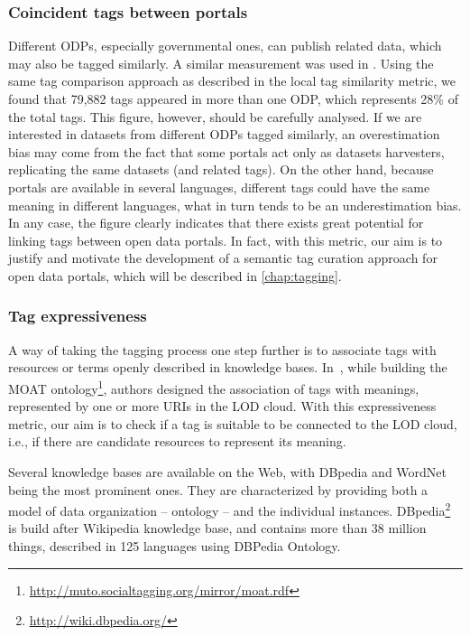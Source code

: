\subsubsection{Coincident tags between portals}
Different ODPs, especially governmental ones, can publish related data, which may also be tagged similarly.
A similar measurement was used in \cite{Umbrich2015}.
Using the same tag comparison approach as described in the local tag similarity metric, we found that 79,882 tags appeared in more than one ODP, which represents 28\% of the total tags. 
This figure, however, should be carefully analysed. 
If we are interested in datasets from different ODPs tagged similarly, an overestimation bias may come from the fact that some portals act only as datasets harvesters, replicating the same datasets (and related tags). 
On the other hand, because portals are available in several languages, different tags could have the same meaning in different languages, what in turn tends to be an underestimation bias.
In any case, the figure clearly indicates that there exists great potential for linking tags between open data portals.
In fact, with this metric, our aim is to justify and motivate the development of a semantic tag curation approach for open data portals, which will be described in \autoref{chap:tagging}. 



\subsubsection{Tag expressiveness}
A way of taking the tagging process one step further is to associate tags with resources or terms openly described in knowledge bases.
In~\cite{Passant2008}, while building the MOAT ontology\footnote{\url{http://muto.socialtagging.org/mirror/moat.rdf}}, authors designed the association of tags with meanings, represented by one or more URIs in the LOD cloud.
With this expressiveness metric, our aim is to check if a tag is suitable to be connected to the LOD cloud, i.e., if there are candidate resources to represent its meaning.

Several knowledge bases are available on the Web, with DBpedia and WordNet being the most prominent ones.
They are characterized by providing both a model of data organization -- ontology -- and the individual instances.
DBpedia\footnote{\url{http://wiki.dbpedia.org/}} is build after Wikipedia knowledge base, and contains more than 38 million things, described in 125 languages using DBPedia Ontology.

